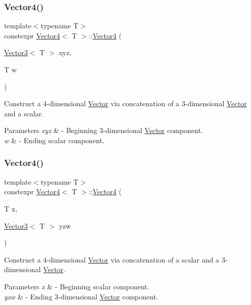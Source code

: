 \subsubsection{\texorpdfstring{Vector4()}{Vector4()}\hspace{0.1cm}{\footnotesize\ttfamily [2/5]}}
{\footnotesize\ttfamily template$<$typename T$>$ \\
constexpr \mbox{\hyperlink{class_vector4}{Vector4}}$<$ T $>$\+::\mbox{\hyperlink{class_vector4}{Vector4}} (\begin{DoxyParamCaption}\item[{\mbox{\hyperlink{class_vector3}{Vector3}}$<$ T $>$}]{xyz,  }\item[{T}]{w }\end{DoxyParamCaption})}

Construct a 4-\/dimensional \mbox{\hyperlink{class_vector}{Vector}} via concatenation of a 3-\/dimensional \mbox{\hyperlink{class_vector}{Vector}} and a scalar. 
\begin{DoxyParams}{Parameters}
{\em xyz} & -\/ Beginning 3-\/dimensional \mbox{\hyperlink{class_vector}{Vector}} component. \\
\hline
{\em w} & -\/ Ending scalar component. \\
\hline
\end{DoxyParams}
\mbox{\label{class_vector4_a91352d9e5a2063fdc15234ceb3492dc4}} 
\subsubsection{\texorpdfstring{Vector4()}{Vector4()}\hspace{0.1cm}{\footnotesize\ttfamily [3/5]}}
{\footnotesize\ttfamily template$<$typename T$>$ \\
constexpr \mbox{\hyperlink{class_vector4}{Vector4}}$<$ T $>$\+::\mbox{\hyperlink{class_vector4}{Vector4}} (\begin{DoxyParamCaption}\item[{T}]{x,  }\item[{\mbox{\hyperlink{class_vector3}{Vector3}}$<$ T $>$}]{yzw }\end{DoxyParamCaption})}

Construct a 4-\/dimensional \mbox{\hyperlink{class_vector}{Vector}} via concatenation of a scalar and a 3-\/dimensional \mbox{\hyperlink{class_vector}{Vector}}. 
\begin{DoxyParams}{Parameters}
{\em x} & -\/ Beginning scalar component. \\
\hline
{\em yzw} & -\/ Ending 3-\/dimensional \mbox{\hyperlink{class_vector}{Vector}} component. \\
\hline
\end{DoxyParams}
\mbox{\label{class_vector4_a350701fc93b120a693efc7ab313f0a8a}} 

